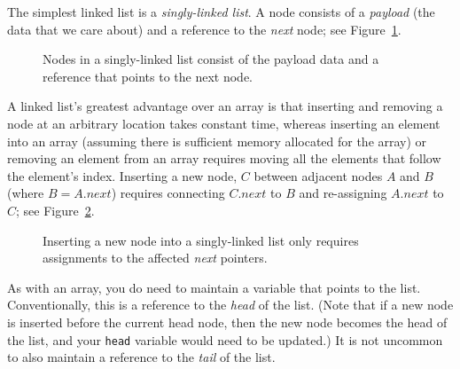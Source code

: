 The simplest linked list is a \textit{singly-linked list}.
A node consists of a \textit{payload} (the data that we care about) and a reference to the \textit{next} node;
see Figure~\ref{fig:singly-linked-list}.

\begin{figure}[h]
    \centering
    \caption{Nodes in a singly-linked list consist of the payload data and a reference that points to the next node.}\label{fig:singly-linked-list}
\end{figure}

A linked list's greatest advantage over an array is that inserting and removing a node at an arbitrary location takes constant time, whereas inserting an element into an array (assuming there is sufficient memory allocated for the array) or removing an element from an array requires moving all the elements that follow the element's index.
Inserting a new node, $C$ between adjacent nodes $A$ and $B$ (where $B = A.next$) requires connecting $C.next$ to $B$ and re-assigning $A.next$ to $C$;
see Figure~\ref{fig:sll-insertion}.

\begin{figure}[h]
    \centering
    \caption{Inserting a new node into a singly-linked list only requires assignments to the affected \textit{next} pointers.}\label{fig:sll-insertion}
\end{figure}

As with an array, you do need to maintain a variable that points to the list.
Conventionally, this is a reference to the \textit{head} of the list. (Note that if a new node is inserted before the current head node, then the new node becomes the head of the list, and your \lstinline{head} variable would need to be updated.)
It is not uncommon to also maintain a reference to the \textit{tail} of the list.

